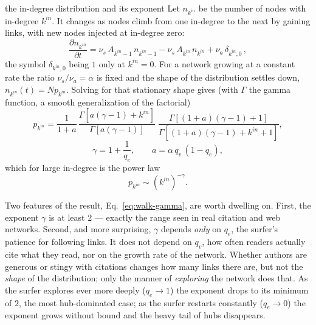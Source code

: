 \begin{calculation}{the in-degree distribution and its exponent}
Let $n_{k^{in}}$ be the number of nodes with in-degree $k^{in}$. It changes as
nodes climb from one in-degree to the next by gaining links, with new nodes
injected at in-degree zero:
\begin{equation}
  \frac{\partial n_{k^{in}}}{\partial t}
  = \nu_s\, A_{k^{in}-1}\, n_{k^{in}-1}
  - \nu_s\, A_{k^{in}}\, n_{k^{in}}
  + \nu_a\, \delta_{k^{in},0}\,,
  \label{eq:walk-rate}
\end{equation}
the symbol $\delta_{k^{in},0}$ being $1$ only at $k^{in}=0$. For a network
growing at a constant rate the ratio $\nu_s/\nu_a=\alpha$ is fixed and the shape
of the distribution settles down, $n_{k^{in}}(t)=N p_{k^{in}}$. Solving for that
stationary shape gives (with $\Gamma$ the gamma function, a smooth
generalization of the factorial)
\begin{equation}
  p_{k^{in}} = \frac{1}{1+a}\,
  \frac{\Gamma[a(\gamma-1)+k^{in}]}{\Gamma[a(\gamma-1)]}\;
  \frac{\Gamma[(1+a)(\gamma-1)+1]}{\Gamma[(1+a)(\gamma-1)+k^{in}+1]},
  \label{eq:walk-pk}
\end{equation}
\begin{equation}
  \gamma = 1 + \frac{1}{q_e}, \qquad a = \alpha\, q_v\,(1-q_e),
  \label{eq:walk-gamma}
\end{equation}
which for large in-degree is the power law
\begin{equation}
  p_{k^{in}} \sim (k^{in})^{-\gamma}.
  \label{eq:walk-asym}
\end{equation}
\end{calculation}

Two features of the result, Eq.~\eqref{eq:walk-gamma}, are worth dwelling on.
First, the exponent $\gamma$ is at least $2$ --- exactly the range seen in real
citation and web networks. Second, and more surprising, $\gamma$ depends
\emph{only} on $q_e$, the surfer's patience for following links. It does not
depend on $q_v$, how often readers actually cite what they read, nor on the
growth rate of the network. Whether authors are generous or stingy with
citations changes how many links there are, but not the \emph{shape} of the
distribution; only the manner of \emph{exploring} the network does that. As the
surfer explores ever more deeply ($q_e\to 1$) the exponent drops to its minimum
of $2$, the most hub-dominated case; as the surfer restarts constantly ($q_e\to
0$) the exponent grows without bound and the heavy tail of hubs disappears.

